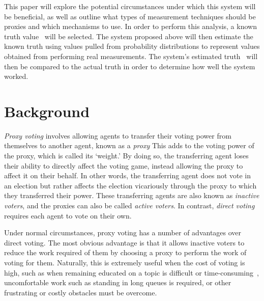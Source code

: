 This paper will explore the potential circumstances under which this system will be
beneficial, as well as outline what types of measurement techniques should be proxies
and which mechanisms to use.
In order to perform this analysis, a known truth value \truth\ will be selected.  
The system proposed above will then estimate the known truth using
values pulled from probability distributions to represent values obtained from
performing real measurements.
The system's estimated truth \systemtruth\ will then be compared to the actual truth
in order to determine how well the system worked.



\section{Background}\label{sec:background}
\textit{Proxy voting} involves allowing agents to transfer their voting power
from themselves to another agent, known as a \textit{proxy}\cite[para.~1.4]
{Cohensius2017}  
This adds to the voting power of the proxy, which is called its `weight.'
By doing so, the transferring agent loses their ability to directly affect the
voting game, instead allowing the proxy to affect it on their behalf.
In other words, the transferring agent does not vote in an election but rather
affects the election vicariously through the proxy to which they transferred
their power.
These transferring agents are also known as \textit{inactive voters}, and the
proxies can also be called \textit{active voters}.
In contrast, \textit{direct voting} requires each agent to vote on their own.

Under normal circumstances, proxy voting has a number of advantages over direct voting.
The most obvious advantage is that it allows inactive voters to reduce the work
required of them by choosing a proxy to perform the work of voting for them.
Naturally, this is extremely useful when the cost of voting is high, such as
when remaining educated on a topic is difficult or
time-consuming~\cite[para.~1.1]{Mueller1972}, uncomfortable work such as
standing in long queues is required, or other frustrating or costly obstacles
must be overcome.  

